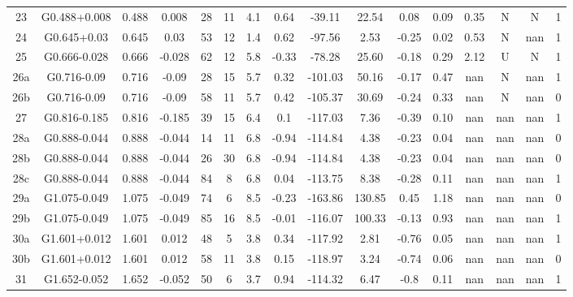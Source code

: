 \begin{table}
\begin{tabular}{cccccccccccccccc}
23 & G0.488+0.008 & 0.488 & 0.008 & 28 & 11 & 4.1 & 0.64 & -39.11 & 22.54 & 0.08 & 0.09 & 0.35 & N & N & 1 \\
24 & G0.645+0.03 & 0.645 & 0.03 & 53 & 12 & 1.4 & 0.62 & -97.56 & 2.53 & -0.25 & 0.02 & 0.53 & N & nan & 1 \\
25 & G0.666-0.028 & 0.666 & -0.028 & 62 & 12 & 5.8 & -0.33 & -78.28 & 25.60 & -0.18 & 0.29 & 2.12 & U & N & 1 \\
26a & G0.716-0.09 & 0.716 & -0.09 & 28 & 15 & 5.7 & 0.32 & -101.03 & 50.16 & -0.17 & 0.47 & nan & N & nan & 1 \\
26b & G0.716-0.09 & 0.716 & -0.09 & 58 & 11 & 5.7 & 0.42 & -105.37 & 30.69 & -0.24 & 0.33 & nan & N & nan & 0 \\
27 & G0.816-0.185 & 0.816 & -0.185 & 39 & 15 & 6.4 & 0.1 & -117.03 & 7.36 & -0.39 & 0.10 & nan & nan & nan & 1 \\
28a & G0.888-0.044 & 0.888 & -0.044 & 14 & 11 & 6.8 & -0.94 & -114.84 & 4.38 & -0.23 & 0.04 & nan & nan & nan & 0 \\
28b & G0.888-0.044 & 0.888 & -0.044 & 26 & 30 & 6.8 & -0.94 & -114.84 & 4.38 & -0.23 & 0.04 & nan & nan & nan & 0 \\
28c & G0.888-0.044 & 0.888 & -0.044 & 84 & 8 & 6.8 & 0.04 & -113.75 & 8.38 & -0.28 & 0.11 & nan & nan & nan & 1 \\
29a & G1.075-0.049 & 1.075 & -0.049 & 74 & 6 & 8.5 & -0.23 & -163.86 & 130.85 & 0.45 & 1.18 & nan & nan & nan & 0 \\
29b & G1.075-0.049 & 1.075 & -0.049 & 85 & 16 & 8.5 & -0.01 & -116.07 & 100.33 & -0.13 & 0.93 & nan & nan & nan & 1 \\
30a & G1.601+0.012 & 1.601 & 0.012 & 48 & 5 & 3.8 & 0.34 & -117.92 & 2.81 & -0.76 & 0.05 & nan & nan & nan & 1 \\
30b & G1.601+0.012 & 1.601 & 0.012 & 58 & 11 & 3.8 & 0.15 & -118.97 & 3.24 & -0.74 & 0.06 & nan & nan & nan & 0 \\
31 & G1.652-0.052 & 1.652 & -0.052 & 50 & 6 & 3.7 & 0.94 & -114.32 & 6.47 & -0.8 & 0.11 & nan & nan & nan & 1 \\
\end{tabular}
\end{table}
